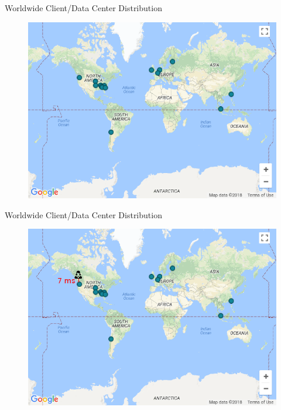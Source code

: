 \documentclass[12pt]{beamer}
\begin{document}
\begin{frame}{Worldwide Client/Data Center Distribution}
    \begin{figure}
        \center
        \includegraphics[scale=0.45]{apollo_google_dc}
    \end{figure}
\end{frame}

\begin{frame}{Worldwide Client/Data Center Distribution}
    \begin{figure}
        \center
        \includegraphics[scale=0.45]{apollo_google_vancouver}
    \end{figure}
\end{frame}
\end{document}
